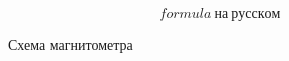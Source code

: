 \documentclass[a4paper,oneside]{book}
\begin{document}
    
    \begin{equation}
        formula~на~русском
    \end{equation}
    

    \begin{wrapfigure}{r}{0.4\textwidth}
        \caption{Схема магнитометра}
    \end{wrapfigure}

    
    
    
\end{document}
